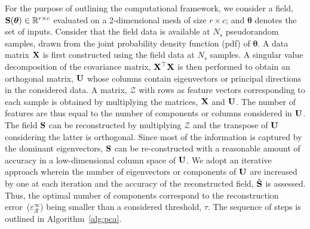 For the purpose of outlining the computational framework, we consider a field,
$\mathbf{{S}}(\bm{\theta})\in\mathbb{R}^{r\times c}$ evaluated on a 2-dimensional mesh of size $r\times c$;
and $\bm{\theta}$ denotes the set of inputs. Consider that the field data is available at $N_s$ pseudorandom
samples, drawn from the joint probability density function (pdf) of $\bm{\theta}$. A data matrix $\mathbf{{X}}$ is
first constructed using the field data at $N_s$ samples. A singular value decomposition of the covariance
matrix, $\mathbf{{X^\top X}}$ is then performed to obtain an orthogonal matrix, $\mathbf{{U}}$ whose columns 
contain eigenvectors or principal directions in the considered data. A matrix, $\mathcal{Z}$ with 
rows as feature vectors corresponding to each
sample is obtained by multiplying the matrices, $\mathbf{{X}}$ and $\mathbf{{U}}$. The number of features
are thus equal to the number of components or columns considered in $\mathbf{{U}}$. 
The field $\mathbf{{S}}$ can be reconstructed by multiplying $\mathcal{Z}$ and the transpose of $\mathbf{{U}}$
considering the latter is orthogonal. 
Since most of the information is captured by the dominant eigenvectors, $\mathbf{{S}}$ can be re-constructed with a
reasonable amount of accuracy in a low-dimensional column space of $\mathbf{{U}}$. We adopt an iterative
approach wherein the number of eigenvectors or components of $\mathbf{{U}}$ are increased by one at each iteration
and the accuracy of the reconstructed field, $\hat{\mathbf{{S}}}$ is assessed. Thus, the optimal number of components
correspond to the reconstruction error~($\varepsilon_\mathcal{R}^\infty$) 
being smaller than a considered threshold, $\tau$. The sequence of steps
is outlined in Algorithm~\ref{alg:pca}.
%
\bigskip
